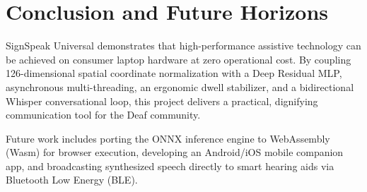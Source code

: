 \section{Conclusion and Future Horizons}
SignSpeak Universal demonstrates that high-performance assistive technology can be achieved on consumer laptop hardware at zero operational cost. By coupling 126-dimensional spatial coordinate normalization with a Deep Residual MLP, asynchronous multi-threading, an ergonomic dwell stabilizer, and a bidirectional Whisper conversational loop, this project delivers a practical, dignifying communication tool for the Deaf community.

Future work includes porting the ONNX inference engine to WebAssembly (Wasm) for browser execution, developing an Android/iOS mobile companion app, and broadcasting synthesized speech directly to smart hearing aids via Bluetooth Low Energy (BLE).
